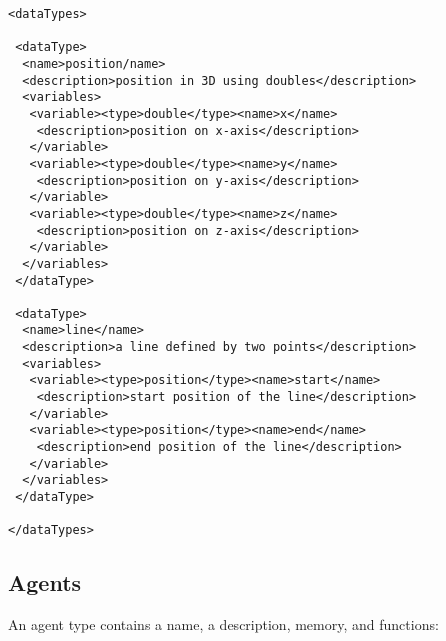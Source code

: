 \begin{mylisting}
\begin{verbatim}
<dataTypes>

 <dataType>
  <name>position/name>
  <description>position in 3D using doubles</description>
  <variables>
   <variable><type>double</type><name>x</name>
    <description>position on x-axis</description>
   </variable>
   <variable><type>double</type><name>y</name>
    <description>position on y-axis</description>
   </variable>
   <variable><type>double</type><name>z</name>
    <description>position on z-axis</description>
   </variable>
  </variables>
 </dataType>

 <dataType>
  <name>line</name>
  <description>a line defined by two points</description>
  <variables>
   <variable><type>position</type><name>start</name>
    <description>start position of the line</description>
   </variable>
   <variable><type>position</type><name>end</name>
    <description>end position of the line</description>
   </variable>
  </variables>
 </dataType>

</dataTypes>
\end{verbatim}
\end{mylisting}

\subsection{Agents}

An agent type contains a name, a description, memory, and functions:

